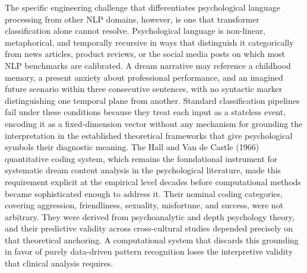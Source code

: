 \documentclass[12pt,a4paper]{report}
\begin{document}
The specific engineering challenge that differentiates psychological language processing from other NLP domains, however, is one that transformer classification alone cannot resolve. Psychological language is non-linear, metaphorical, and temporally recursive in ways that distinguish it categorically from news articles, product reviews, or the social media posts on which most NLP benchmarks are calibrated. A dream narrative may reference a childhood memory, a present anxiety about professional performance, and an imagined future scenario within three consecutive sentences, with no syntactic marker distinguishing one temporal plane from another. Standard classification pipelines fail under these conditions because they treat each input as a stateless event, encoding it as a fixed-dimension vector without any mechanism for grounding the interpretation in the established theoretical frameworks that give psychological symbols their diagnostic meaning. The Hall and Van de Castle (1966) quantitative coding system, which remains the foundational instrument for systematic dream content analysis in the psychological literature, made this requirement explicit at the empirical level decades before computational methods became sophisticated enough to address it. Their nominal coding categories, covering aggression, friendliness, sexuality, misfortune, and success, were not arbitrary. They were derived from psychoanalytic and depth psychology theory, and their predictive validity across cross-cultural studies depended precisely on that theoretical anchoring. A computational system that discards this grounding in favor of purely data-driven pattern recognition loses the interpretive validity that clinical analysis requires.
\end{document}
